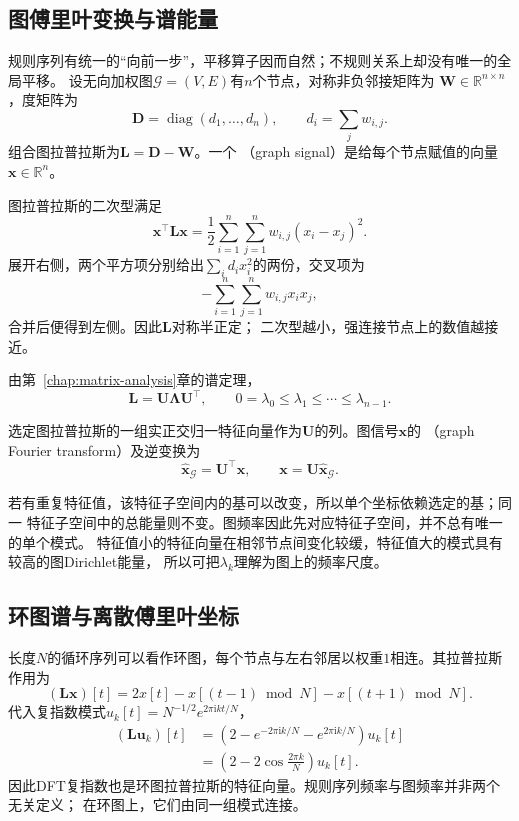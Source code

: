\subsection{图傅里叶变换与谱能量}

规则序列有统一的“向前一步”，平移算子因而自然；不规则关系上却没有唯一的全局平移。
设无向加权图$\mathcal{G}=(V,E)$有$n$个节点，对称非负邻接矩阵为
$\bm{W}\in\mathbb{R}^{n\times n}$，度矩阵为
\[
  \bm{D}=\operatorname{diag}(d_1,\ldots,d_n),
  \qquad d_i=\sum_jw_{i,j}.
\]
组合图拉普拉斯为$\bm{L}=\bm{D}-\bm{W}$。一个
（graph signal）是给每个节点赋值的向量
$\bm{x}\in\mathbb{R}^n$。

图拉普拉斯的二次型满足
\begin{equation}
  \bm{x}^{\top}\bm{L}\bm{x}
  =
  \frac{1}{2}\sum_{i=1}^{n}\sum_{j=1}^{n}
  w_{i,j}(x_i-x_j)^2.
  \label{eq:signal-analysis-graph-dirichlet-energy}
\end{equation}
展开右侧，两个平方项分别给出$\sum_i d_ix_i^2$的两份，交叉项为
\[
  -\sum_{i=1}^{n}\sum_{j=1}^{n}w_{i,j}x_ix_j,
\]
合并后便得到左侧。因此$\bm{L}$对称半正定；
二次型越小，强连接节点上的数值越接近。

由第~\ref{chap:matrix-analysis}章的谱定理，
\[
  \bm{L}=\bm{U}\bm{\Lambda}\bm{U}^{\top},
  \qquad
  0=\lambda_0\leq\lambda_1\leq\cdots\leq\lambda_{n-1}.
\]
\begin{definition}[图傅里叶变换]
\label{def:signal-analysis-graph-fourier-transform}
选定图拉普拉斯的一组实正交归一特征向量作为$\bm U$的列。图信号$\bm x$的
（graph Fourier transform）及逆变换为
\begin{equation}
  \widehat{\bm{x}}_{\mathcal{G}}
  =
  \bm{U}^{\top}\bm{x},
  \qquad
  \bm{x}
  =
  \bm{U}\widehat{\bm{x}}_{\mathcal{G}}.
  \label{eq:signal-analysis-graph-fourier}
\end{equation}
\end{definition}
若有重复特征值，该特征子空间内的基可以改变，所以单个坐标依赖选定的基；同一
特征子空间中的总能量则不变。图频率因此先对应特征子空间，并不总有唯一的单个模式。
特征值小的特征向量在相邻节点间变化较缓，特征值大的模式具有较高的图Dirichlet能量，
所以可把$\lambda_k$理解为图上的频率尺度。

\subsection{环图谱与离散傅里叶坐标}

长度$N$的循环序列可以看作环图，每个节点与左右邻居以权重$1$相连。其拉普拉斯作用为
\[
  (\bm{L}\bm{x})[t]
  =
  2x[t]-x[(t-1)\bmod N]-x[(t+1)\bmod N].
\]
代入复指数模式$u_k[t]=N^{-1/2}e^{2\pi\mathrm{i}kt/N}$，
\begin{align*}
  (\bm{L}\bm{u}_k)[t]
  &=
  \left(
    2-e^{-2\pi\mathrm{i}k/N}
      -e^{2\pi\mathrm{i}k/N}
  \right)u_k[t]\\
  &=
  \left(2-2\cos\frac{2\pi k}{N}\right)u_k[t].
\end{align*}
因此DFT复指数也是环图拉普拉斯的特征向量。规则序列频率与图频率并非两个无关定义；
在环图上，它们由同一组模式连接。

